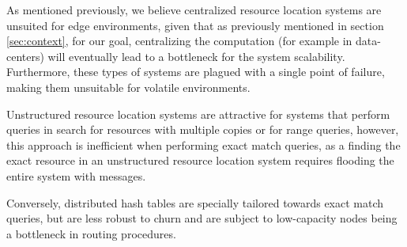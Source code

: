 As mentioned previously, we believe centralized resource location systems are unsuited for edge environments, given that as previously mentioned in section \ref{sec:context}, for our goal, centralizing the computation (for example in data-centers) will eventually lead to a bottleneck for the system scalability. Furthermore, these types of systems are plagued with a single point of failure, making them unsuitable for volatile environments.

Unstructured resource location systems are attractive for systems that perform queries in search for resources with multiple copies or for range queries, however, this approach is inefficient when performing exact match queries, as a finding the exact resource in an unstructured resource location system requires flooding the entire system with messages.

Conversely, distributed hash tables are specially tailored towards exact match queries, but are less robust to churn and are subject to low-capacity nodes being a bottleneck in routing procedures. 










